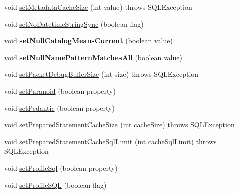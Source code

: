 \begin{DoxyCompactItemize}
\item 
void \mbox{\hyperlink{interfacecom_1_1mysql_1_1jdbc_1_1_connection_properties_aa29a8dc1d36b7044717dce95a3ddbc4e}{set\+Metadata\+Cache\+Size}} (int value)  throws S\+Q\+L\+Exception
\item 
void \mbox{\hyperlink{interfacecom_1_1mysql_1_1jdbc_1_1_connection_properties_a01c8815660b50a6db2e6f89f796e3ee9}{set\+No\+Datetime\+String\+Sync}} (boolean flag)
\item 
\mbox{\label{interfacecom_1_1mysql_1_1jdbc_1_1_connection_properties_a38a89232b7de4fe21c7b1a78752848e1}} 
void {\bfseries set\+Null\+Catalog\+Means\+Current} (boolean value)
\item 
\mbox{\label{interfacecom_1_1mysql_1_1jdbc_1_1_connection_properties_a066e39ea6b4284565dfd493d3d2df8c0}} 
void {\bfseries set\+Null\+Name\+Pattern\+Matches\+All} (boolean value)
\item 
void \mbox{\hyperlink{interfacecom_1_1mysql_1_1jdbc_1_1_connection_properties_ae0414fc9a146276fb458dc6e6b423f98}{set\+Packet\+Debug\+Buffer\+Size}} (int size)  throws S\+Q\+L\+Exception
\item 
void \mbox{\hyperlink{interfacecom_1_1mysql_1_1jdbc_1_1_connection_properties_a01cf4f506ad942b96a36708c33221a48}{set\+Paranoid}} (boolean property)
\item 
void \mbox{\hyperlink{interfacecom_1_1mysql_1_1jdbc_1_1_connection_properties_acc7191665477c54523bc25845278b99f}{set\+Pedantic}} (boolean property)
\item 
void \mbox{\hyperlink{interfacecom_1_1mysql_1_1jdbc_1_1_connection_properties_ad65dad2e98f66f1b4a8d1aff24cbc2d5}{set\+Prepared\+Statement\+Cache\+Size}} (int cache\+Size)  throws S\+Q\+L\+Exception
\item 
void \mbox{\hyperlink{interfacecom_1_1mysql_1_1jdbc_1_1_connection_properties_a7cf7fc262516d73e70ac5dbba0d6a510}{set\+Prepared\+Statement\+Cache\+Sql\+Limit}} (int cache\+Sql\+Limit)  throws S\+Q\+L\+Exception
\item 
void \mbox{\hyperlink{interfacecom_1_1mysql_1_1jdbc_1_1_connection_properties_a6e32297fa42ce676613c35580365416a}{set\+Profile\+Sql}} (boolean property)
\item 
void \mbox{\hyperlink{interfacecom_1_1mysql_1_1jdbc_1_1_connection_properties_a6c91e5a3250a313eee67f7174599be99}{set\+Profile\+S\+QL}} (boolean flag)

\end{DoxyCompactItemize}
